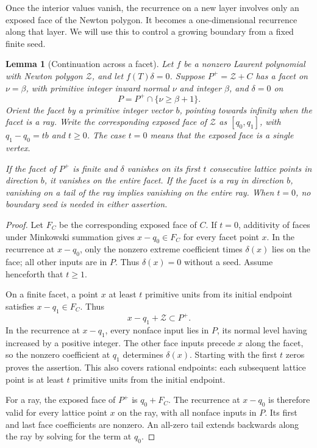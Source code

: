 \documentclass[11pt]{article}
\numberwithin{equation}{section}
\newtheorem{lemma}[theorem]{Lemma}
\theoremstyle{definition}
\theoremstyle{remark}
\newcommand{\ZZ}{\mathcal Z}
\begin{document}
Once the interior values vanish, the recurrence on a new layer involves only an exposed face of
the Newton polygon. It becomes a one-dimensional recurrence along that layer. We will use this to control a growing boundary from a fixed finite seed.

\begin{lemma}[Continuation across a facet]\label{lem:facet}
Let $f$ be a nonzero Laurent polynomial with Newton polygon $\ZZ$, and let $f(T)\delta=0$. Suppose
$P^+=\ZZ+C$ has a facet on $\nu=\beta$, with primitive integer inward normal $\nu$ and integer
$\beta$, and $\delta=0$ on
\[
 P=P^+\cap\{\nu\ge\beta+1\}.
\]
Orient the facet by a primitive integer vector $b$, pointing towards infinity when the facet is a
ray. Write the corresponding exposed face of $\ZZ$ as $[q_0,q_1]$, with $q_1-q_0=tb$ and $t\ge0$.
The case $t=0$ means that the exposed face is a single vertex.

If the facet of $P^+$ is finite and $\delta$ vanishes on its first $t$ consecutive lattice points in
direction $b$, it vanishes on the entire facet. If the facet is a ray in direction $b$, vanishing on
a tail of the ray implies vanishing on the entire ray. When $t=0$, no boundary seed is needed in
either assertion.
\end{lemma}
\begin{proof}
Let $F_C$ be the corresponding exposed face of $C$. If $t=0$, additivity of faces under Minkowski
summation gives $x-q_0\in F_C$ for every facet point $x$. In the recurrence at $x-q_0$, only the
nonzero extreme coefficient times $\delta(x)$ lies on the face; all other inputs are in $P$.
Thus $\delta(x)=0$ without a seed. Assume henceforth that $t\ge1$.

On a finite facet, a point $x$ at least $t$ primitive units from its initial endpoint satisfies
$x-q_1\in F_C$. Thus
\[
 x-q_1+\ZZ\subset P^+.
\]
In the recurrence at $x-q_1$, every nonface input lies in $P$, its normal level having increased by
a positive integer. The other face inputs precede $x$ along the facet, so the nonzero coefficient at
$q_1$ determines $\delta(x)$. Starting with the first $t$ zeros proves the assertion. This also
covers rational endpoints: each subsequent lattice point is at least $t$ primitive units from the
initial endpoint.

For a ray, the exposed face of $P^+$ is $q_0+F_C$. The recurrence at $x-q_0$ is therefore valid for
every lattice point $x$ on the ray, with all nonface inputs in $P$. Its first and last face
coefficients are nonzero. An all-zero tail extends backwards along the ray by solving for the term
at $q_0$.
\end{proof}
\end{document}
